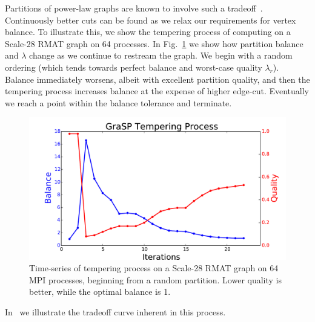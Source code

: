Partitions of power-law graphs are known to involve such a tradeoff~\cite{Lang04findinggood}. Continuously better cuts can be found as we relax our requirements for vertex balance. To illustrate this, we show the tempering process of \ourmethod computing on a Scale-28 RMAT graph on 64 processes. In Fig.~\ref{fig:process} we show how partition balance and $\lambda$ change as we continue to restream the graph. We begin with a random ordering (which tends towards perfect balance and worst-case quality $\lambda_r$). Balance immediately worsens, albeit with excellent partition quality, and then the tempering process increases balance at the expense of higher edge-cut. Eventually we reach a point within the balance tolerance and terminate. 

\begin{figure}[t!]
\centering
\includegraphics[width=0.9\columnwidth] {figures/tradeoff_process.pdf}
\caption[Caption for]{ Time-series of tempering process on a Scale-28 RMAT graph on 64 MPI processes, beginning from a random partition. Lower quality is better, while the optimal balance is 1. }
\label{fig:process}
\end{figure}

In~ we illustrate the tradeoff curve inherent in this process.

